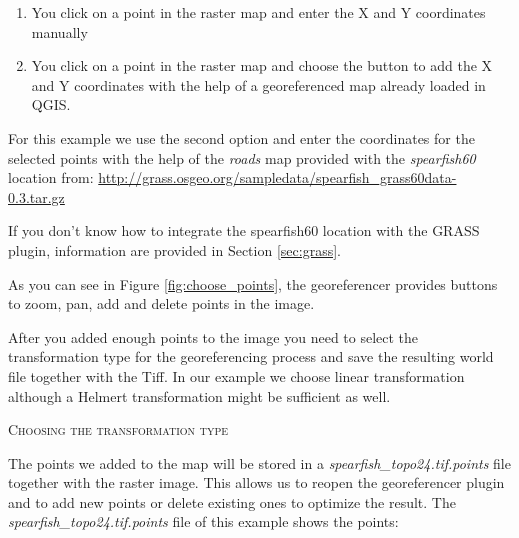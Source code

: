 \begin{enumerate}
\item You click on a point in the raster map and enter the X and Y coordinates manually
\item You click on a point in the raster map and choose the button  to add the X and Y coordinates with the help of a georeferenced map already loaded in QGIS.
\end{enumerate}


For this example we use the second option and enter the coordinates for the selected points with the help of the \textsl{roads} map provided with the  \textsl{spearfish60} location from: \url{http://grass.osgeo.org/sampledata/spearfish\_grass60data-0.3.tar.gz}

If you don't know how to integrate the spearfish60 location with the GRASS plugin, information are provided in Section \ref{sec:grass}.

As you can see in Figure \ref{fig:choose_points}, the georeferencer provides buttons to zoom, pan, add and delete points in the image.

After you added enough points to the image you need to select the transformation type for the georeferencing process and save the resulting world file together with the Tiff.
In our example we choose linear transformation although a Helmert transformation might be sufficient as well.


\begin{Tip}\caption{\textsc{Choosing the transformation type}}
\end{Tip} 

The points we added to the map will be stored in a \textsl{spearfish\_topo24.tif.points} file together with the raster image.
This allows us to reopen the georeferencer plugin and to add new points or delete existing ones to optimize the result.
The \textsl{spearfish\_topo24.tif.points} file of this example shows the points:

